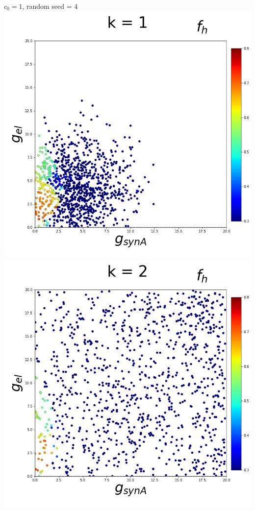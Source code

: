 \documentclass[11pt]{article}
\begin{document}
\begin{center}
{\Large $c_0 = 1$, random seed = 4} \\
\includegraphics[scale=0.125]{DSN_figs/STGCircuit_DSN_c=0_rs=4_k=1.png}
\includegraphics[scale=0.125]{DSN_figs/STGCircuit_DSN_c=0_rs=4_k=2.png}

\end{center}
\end{document}
